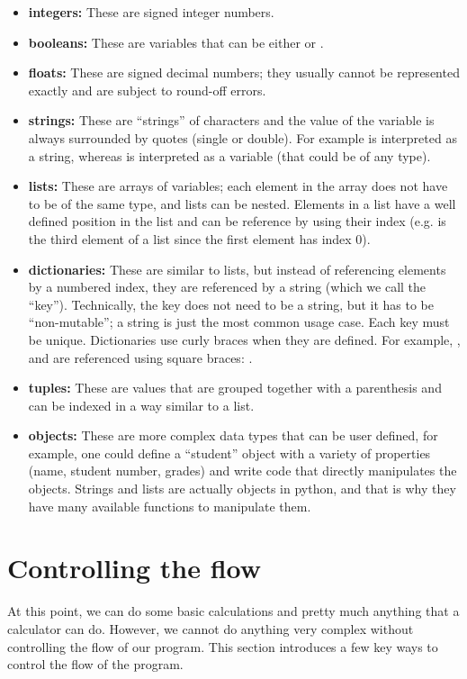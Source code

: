 \begin{itemize}
\item \textbf{integers:} These are signed integer numbers.
\item \textbf{booleans:} These are variables that can be either  or .
\item \textbf{floats:} These are signed decimal numbers; they usually cannot be represented exactly and are subject to round-off errors.
\item \textbf{strings:} These are ``strings'' of characters and the value of the variable is always surrounded by quotes (single or double). For example  is interpreted as a string, whereas  is interpreted as a variable (that could be of any type).
\item \textbf{lists:} These are arrays of variables; each element in the array does not have to be of the same type, and lists can be nested. Elements in a list have a well defined position in the list and can be reference by using their index (e.g.  is the third element of a list since the first element has index 0).
\item \textbf{dictionaries:} These are similar to lists, but instead of referencing elements by a numbered index, they are referenced by a string (which we call the ``key''). Technically, the key does not need to be a string, but it has to be ``non-mutable''; a string is just the most common usage case. Each key must be unique. Dictionaries use curly braces when they are defined. For example, , and are referenced using square braces: . 
\item \textbf{tuples:} These are values that are grouped together with a parenthesis and can be indexed in a way similar to a list.
\item \textbf{objects:} These are more complex data types that can be user defined, for example, one could define a ``student'' object with a variety of properties (name, student number, grades) and write code that directly manipulates the objects. Strings and lists are actually objects in python, and that is why they have many available functions to manipulate them.
\end{itemize}

\section{Controlling the flow}
At this point, we can do some basic calculations and pretty much anything that a calculator can do. However, we cannot do anything very complex without controlling the flow of our program. This section introduces a few key ways to control the flow of the program.
